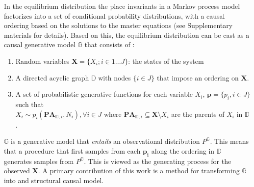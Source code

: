 \documentclass{article}
\begin{document}
In the equilibrium distribution the place invariants in a Markov process model factorizes into a set of conditional probability distributions, with a causal ordering based on the solutions to the master equations (see Supplementary materials for details). Based on this, the equilibrium distribution can be cast as a causal generative model $\mathbb{G}$ that consists of \cite{pearl2009causal, peters2017elements}:
\vspace{-3mm}
\begin{enumerate}
\item Random variables $\mathbf{X}=\{X_i; i \in 1...J\}$: the states of the system 
\item A directed acyclic graph $\mathbb{D}$ with nodes $\{i \in J\}$ that impose an ordering on $\mathbf{X}$.
\item A set of probabilistic generative functions for each variable $X_i$, $\mathbf{p}=\{p_i, i \in J\}$ such that\\ 
$X_i \sim p_i(\mathbf{PA}_{\mathbb{D}, i}, N_i), \forall i \in J$ 
where $\mathbf{PA}_{\mathbb{D}, i} \subseteq \mathbf{X} \setminus X_i$ are the parents of $X_i$ in $\mathbb{D}$. 
\end{enumerate}
\vspace{-5mm}
$\mathbb{G}$ is a generative model that \emph{entails} an observational distribution $P^{\mathbb{G}}$. This means that a procedure that first samples from each $\mathbf{p_i}$ along the ordering in $\mathbb{D}$ generates samples from $P^{\mathbb{G}}$. This is viewed as the generating process for the observed $\mathbf{X}$. A primary contribution of this work is a method for transforming $\mathbb{G}$ into and structural causal model.
\end{document}
